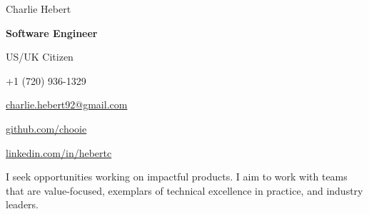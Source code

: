 \begin{center}
  {\Huge Charlie Hebert}

  \textbf{Software Engineer}

  US/UK Citizen
\end{center}

\noindent
\begin{minipage}[t]{0.5\textwidth}
  \begin{description}
    \raggedright
    \item[Mobile] +1 (720) 936-1329
    \item[Email]
      \href{mailto:charlie.hebert92@gmail.com}{charlie.hebert92@gmail.com}
  \end{description}
\end{minipage}
\noindent
\noindent
\begin{minipage}[t]{0.5\textwidth}
  \begin{description}
    \raggedleft
    \item[Github] \href{http://www.github.com/chooie}{github.com/chooie}
    \item[LinkedIn]
      \href{http://linkedin.com/in/hebertc}{linkedin.com/in/hebertc}
  \end{description}
\end{minipage}
\noindent

\begin{center}
  I seek opportunities working on impactful products. I aim to work with teams
  that are value-focused, exemplars of technical excellence in practice, and
  industry leaders.
\end{center}

